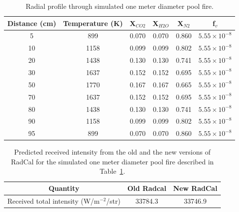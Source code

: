 \begin{table}[ht]
      \centering
\caption{Radial profile through simulated one meter diameter pool fire.\label{table::test5_fire}}
\begin{tabular}{|c|c|c|c|c|c|} \hline
Distance (cm) & Temperature (K) & X$_{CO2}$ & X$_{H2O}$ & X$_{N2}$ & f$_v$  \\
\hline
5  & 899  & 0.070 & 0.070 & 0.860 & $5.55\times 10^{-8}$\\
10 & 1158 & 0.099 & 0.099 & 0.802 & $5.55\times 10^{-8}$\\
20 & 1438 & 0.130 & 0.130 & 0.741 & $5.55\times 10^{-8}$\\
30 & 1637 & 0.152 & 0.152 & 0.695 & $5.55\times 10^{-8}$\\
50 & 1770 & 0.167 & 0.167 & 0.665 & $5.55\times 10^{-8}$\\
70 & 1637 & 0.152 & 0.152 & 0.695 & $5.55\times 10^{-8}$\\
80 & 1438 & 0.130 & 0.130 & 0.741 & $5.55\times 10^{-8}$\\
90 & 1158 & 0.099 & 0.099 & 0.802 & $5.55\times 10^{-8}$\\
95 & 899  & 0.070 & 0.070 & 0.860 & $5.55\times 10^{-8}$\\
\hline
\end{tabular}
\end{table}

\begin{table}
\centering
\caption{Predicted received intensity from the old and the new versions of RadCal for the simulated one meter diameter pool fire described in Table~\ref{table::test5_fire}.\label{table::received_flux}}
\begin{tabular}{|c|c|c|} \hline
 Quantity & Old Radcal &New RadCal \\
\hline
 Received total intensity (W/m$^{-2}$/str) & 33784.3 & 33746.9\\
\hline
\end{tabular}
\end{table}

